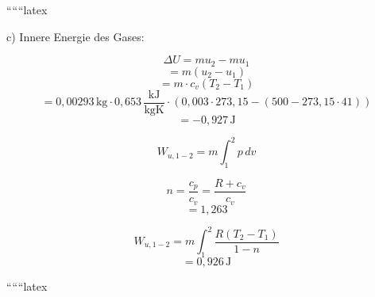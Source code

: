
``````latex


c) Innere Energie des Gases:

\[
\Delta U = m u_2 - m u_1
\]
\[
= m \left( u_2 - u_1 \right)
\]
\[
= m \cdot c_v \left( T_2 - T_1 \right)
\]
\[
= 0{,}00293 \, \text{kg} \cdot 0{,}653 \, \frac{\text{kJ}}{\text{kgK}} \cdot \left( 0{,}003 \cdot 273{,}15 - (500 - 273{,}15 \cdot 41) \right)
\]
\[
= -0{,}927 \, \text{J}
\]

\[
W_{u,1-2} = m \int_{1}^{2} p \, dv
\]

\[
n = \frac{c_p}{c_v} = \frac{R + c_v}{c_v}
\]
\[
= 1{,}263
\]

\[
W_{u,1-2} = m \int_{1}^{2} \frac{R \left( T_2 - T_1 \right)}{1 - n}
\]
\[
= 0{,}926 \, \text{J}
\]

``````latex


